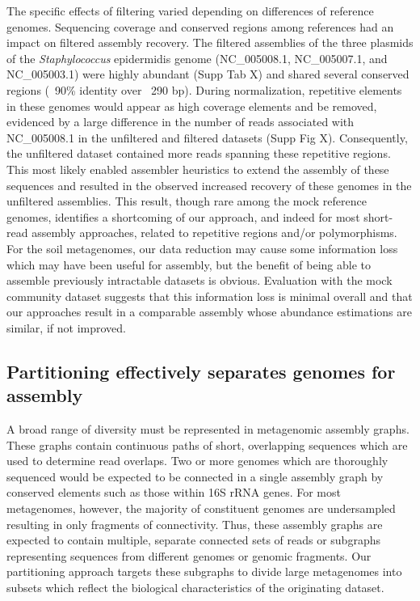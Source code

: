\documentclass[11pt]{article} %
\begin{document}
The specific effects of filtering varied depending on differences of reference genomes.  Sequencing coverage and conserved regions among references had an impact on filtered assembly recovery.  The filtered assemblies of the three plasmids of the \emph{Staphylococcus} epidermidis genome (NC\_005008.1, NC\_005007.1, and NC\_005003.1) were highly abundant (Supp Tab X) and shared several conserved regions (~90\% identity over ~290 bp).  During normalization, repetitive elements in these genomes would appear as high coverage elements and be removed, evidenced by a large difference in the number of reads associated with NC\_005008.1 in the unfiltered and filtered datasets (Supp Fig X). Consequently, the unfiltered dataset contained more reads spanning these repetitive regions.  This most likely enabled assembler heuristics to extend the assembly of these sequences and resulted in the observed increased recovery of these genomes in the unfiltered assemblies. This result, though rare among the mock reference genomes, identifies a shortcoming of our approach, and indeed for most short-read assembly approaches, related to repetitive regions and/or polymorphisms.  For the soil metagenomes, our data reduction may cause some information loss which may have been useful for assembly, but the benefit of being able to assemble previously intractable datasets is obvious.  Evaluation with the mock community dataset suggests that this information loss is minimal overall and that our approaches result in a comparable assembly whose abundance estimations are similar, if not improved.     

\subsection{Partitioning effectively separates genomes for assembly}

A broad range of diversity must be represented in metagenomic assembly graphs.   These graphs contain continuous paths of short, overlapping sequences which are used to determine read overlaps.  Two or more genomes which are thoroughly sequenced would be expected to be connected in a single assembly graph by conserved elements such as those within 16S rRNA genes.  For most metagenomes, however, the majority of constituent genomes are undersampled resulting in only fragments of connectivity.  Thus, these assembly graphs are expected to contain multiple, separate connected sets of reads or subgraphs representing sequences from different genomes or genomic fragments.  Our partitioning approach targets these subgraphs to divide large metagenomes into subsets which reflect the biological characteristics of the originating dataset.  
\end{document}
